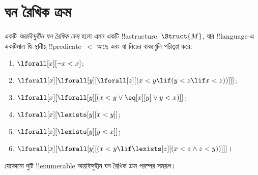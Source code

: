 \documentclass[../../../include/open-logic-section]{subfiles}
\begin{document}
\section{ঘন রৈখিক ক্রম}

\begin{defn}
  একটি \emph{অন্তবিন্দুহীন ঘন রৈখিক ক্রম} হলো এমন একটি
  !!a{structure}~$\Struct{M}$, যার !!{language}-এ একটিমাত্র দ্বি-স্থানীয়
  !!{predicate}~$<$ আছে এবং যা নিচের বাক্যগুলি পরিতৃপ্ত করে:
  \begin{enumerate}
  \item $\lforall[x][\lnot x < x]$;
  \item $\lforall[x][\lforall[y][\lforall[z][(x < y \lif (y < z \lif x
    <z ))]]]$;
  \item $\lforall[x][\lforall[y][(x< y \lor \eq[x][y] \lor y < x)]]$;
  \item $\lforall[x][\lexists[y][x < y]]$;
  \item $\lforall[x][\lexists[y][y < x]]$;
  \item $\lforall[x][\lforall[y][(x < y \lif \lexists[z][(x < z \land
        z < y))]]]$।
 \end{enumerate}
\end{defn}

\begin{thm}
  যেকোনো দুটি !!{enumerable} অন্তবিন্দুহীন ঘন রৈখিক ক্রম পরস্পর সমরূপ।
\end{thm}
\end{document}
